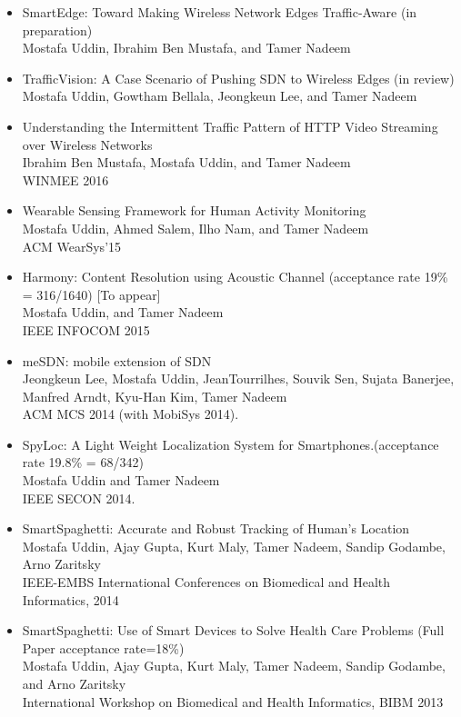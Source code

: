 \documentclass[margin]{res}
\begin{document}
\begin{resume}
\begin{itemize}
\item SmartEdge: Toward Making Wireless Network Edges Traffic-Aware (in preparation)\\
Mostafa Uddin, Ibrahim Ben Mustafa, and Tamer Nadeem

\item TrafficVision: A Case Scenario of Pushing SDN to Wireless Edges (in review)\\
Mostafa Uddin, Gowtham Bellala, Jeongkeun Lee, and Tamer Nadeem

\item Understanding the Intermittent Traffic Pattern of HTTP Video Streaming over Wireless Networks\\
Ibrahim Ben Mustafa, Mostafa Uddin, and Tamer Nadeem\\
WINMEE 2016

\item Wearable Sensing Framework for Human Activity Monitoring \\
Mostafa Uddin, Ahmed Salem, Ilho Nam, and Tamer Nadeem \\
ACM WearSys'15
                 
\item Harmony: Content Resolution using Acoustic Channel (acceptance rate 19\% = 316/1640) [To appear]\\
Mostafa Uddin, and Tamer Nadeem \\
IEEE INFOCOM 2015

\item meSDN: mobile extension of SDN \\
Jeongkeun Lee, Mostafa Uddin, JeanTourrilhes, Souvik Sen, Sujata Banerjee, Manfred Arndt, Kyu-Han Kim, Tamer Nadeem\\ 
ACM MCS 2014 (with MobiSys 2014). 

\item SpyLoc: A Light Weight Localization System for Smartphones.(acceptance rate 19.8\% = 68/342)\\
Mostafa Uddin and Tamer Nadeem\\ 
IEEE SECON 2014. 

\item SmartSpaghetti: Accurate and Robust Tracking of Human's Location\\
Mostafa Uddin, Ajay Gupta, Kurt Maly, Tamer Nadeem, Sandip Godambe, Arno Zaritsky\\ 
IEEE-EMBS International Conferences on Biomedical and Health Informatics, 2014 

\item SmartSpaghetti: Use of Smart Devices to Solve Health Care Problems (Full Paper acceptance rate=18\%)\\
Mostafa Uddin, Ajay Gupta, Kurt Maly, Tamer Nadeem, Sandip Godambe, and Arno Zaritsky\\ 
International Workshop on Biomedical and Health Informatics, BIBM 2013 


\end{itemize}
\end{resume}
\end{document}
